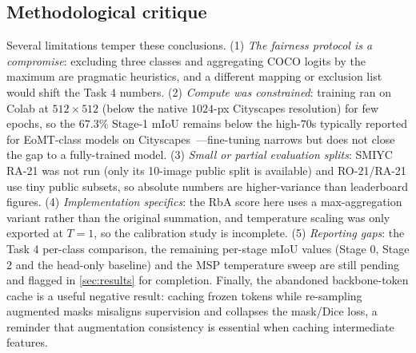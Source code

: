 \subsection{Methodological critique}
Several limitations temper these conclusions. (1) \emph{The fairness protocol
is a compromise}: excluding three classes and aggregating COCO logits by the
maximum are pragmatic heuristics, and a different mapping or exclusion list
would shift the Task 4 numbers. (2) \emph{Compute was constrained}: training
ran on Colab at $512{\times}512$ (below the native $1024$-px Cityscapes
resolution) for few epochs, so the $67.3\%$ Stage-1 mIoU remains below the
high-$70$s typically reported for EoMT-class models on
Cityscapes~\cite{eomt}---fine-tuning narrows but does not close the gap to a
fully-trained model. (3) \emph{Small or partial evaluation splits}: SMIYC RA-21
was not run (only its 10-image public split is available) and RO-21/RA-21 use
tiny public subsets, so absolute numbers are higher-variance than leaderboard
figures. (4) \emph{Implementation specifics}: the RbA score here uses a
max-aggregation variant rather than the original summation, and temperature
scaling was only exported at $T{=}1$, so the calibration study is incomplete.
(5) \emph{Reporting gaps}: the Task 4 per-class comparison, the remaining
per-stage mIoU values (Stage 0, Stage 2 and the head-only baseline) and the MSP
temperature sweep are still pending and flagged in \cref{sec:results} for
completion. Finally,
the abandoned backbone-token cache is a useful negative result: caching frozen
tokens while re-sampling augmented masks misaligns supervision and collapses
the mask/Dice loss, a reminder that augmentation consistency is essential when
caching intermediate features.
